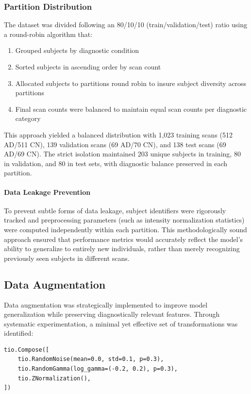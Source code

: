 \documentclass[12pt, a4paper]{article}
\begin{document}
\subsubsection{Partition Distribution}

The dataset was divided following an 80/10/10 (train/validation/test) ratio using a round-robin algorithm that:
\begin{enumerate}
    \item Grouped subjects by diagnostic condition
    \item Sorted subjects in ascending order by scan count
    \item Allocated subjects to partitions round robin to insure subject diversity across partitions
    \item Final scan counts were balanced to maintain equal scan counts per diagnostic category
\end{enumerate}

This approach yielded a balanced distribution with 1,023 training scans (512 AD/511 CN), 139 validation scans (69 AD/70 CN), and 138 test scans (69 AD/69 CN). The strict isolation maintained 203 unique subjects in training, 80 in validation, and 80 in test sets, with diagnostic balance preserved in each partition.

\paragraph{Data Leakage Prevention}

To prevent subtle forms of data leakage, subject identifiers were rigorously tracked and preprocessing parameters (such as intensity normalization statistics) were computed independently within each partition. This methodologically sound approach ensured that performance metrics would accurately reflect the model's ability to generalize to entirely new individuals, rather than merely recognizing previously seen subjects in different scans.

\subsection{Data Augmentation}

Data augmentation was strategically implemented to improve model generalization while preserving diagnostically relevant features. Through systematic experimentation, a minimal yet effective set of transformations was identified:

\begin{verbatim}
tio.Compose([
    tio.RandomNoise(mean=0.0, std=0.1, p=0.3),
    tio.RandomGamma(log_gamma=(-0.2, 0.2), p=0.3),
    tio.ZNormalization(),
])
\end{verbatim}
\end{document}
